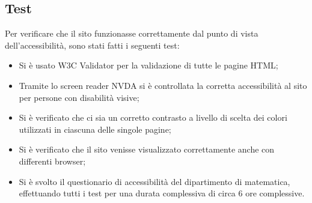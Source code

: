     \newpage
    \subsection{Test}
    \label{Test}
    Per verificare che il sito funzionasse correttamente dal punto di vista dell'accessibilità, sono stati fatti i seguenti test:
    \begin{itemize}
        \item Si è usato W3C Validator per la validazione di tutte le pagine HTML;
        \item Tramite lo screen reader NVDA si è controllata la corretta accessibilità al sito per persone con disabilità visive;
        \item Si è verificato che ci sia un corretto contrasto a livello di scelta dei colori utilizzati in ciascuna delle singole pagine;
        \item Si è  verificato che il sito venisse visualizzato correttamente anche con differenti browser;
        \item Si è svolto il questionario di accessibilità del dipartimento di matematica, effettuando tutti i test per una durata complessiva di circa 6 ore complessive.
    \end{itemize}